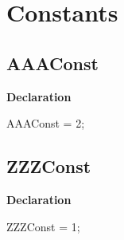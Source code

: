 \documentclass{report}
\newif\ifpdf
\begin{document}
\section{Constants}
\ifpdf
\subsection*{\large{\textbf{AAAConst}}\normalsize\hspace{1ex}\hrulefill}
\else
\subsection*{AAAConst}
\fi
\label{ok_sorting-AAAConst}
\begin{list}{}{
\setlength{\itemindent}{0cm}
\setlength{\listparindent}{0cm}
\setlength{\leftmargin}{\evensidemargin}
\addtolength{\leftmargin}{\tmplength}
\settowidth{\labelsep}{X}
\addtolength{\leftmargin}{\labelsep}
\setlength{\labelwidth}{\tmplength}
}
\item[\textbf{Declaration}\hfill]
\ifpdf
\begin{flushleft}
\fi
\begin{ttfamily}
AAAConst = 2;\end{ttfamily}

\ifpdf
\end{flushleft}
\fi

\end{list}
\ifpdf
\subsection*{\large{\textbf{ZZZConst}}\normalsize\hspace{1ex}\hrulefill}
\else
\subsection*{ZZZConst}
\fi
\label{ok_sorting-ZZZConst}
\begin{list}{}{
\setlength{\itemindent}{0cm}
\setlength{\listparindent}{0cm}
\setlength{\leftmargin}{\evensidemargin}
\addtolength{\leftmargin}{\tmplength}
\settowidth{\labelsep}{X}
\addtolength{\leftmargin}{\labelsep}
\setlength{\labelwidth}{\tmplength}
}
\item[\textbf{Declaration}\hfill]
\ifpdf
\begin{flushleft}
\fi
\begin{ttfamily}
ZZZConst = 1;\end{ttfamily}

\ifpdf
\end{flushleft}
\fi

\end{list}
\end{document}
